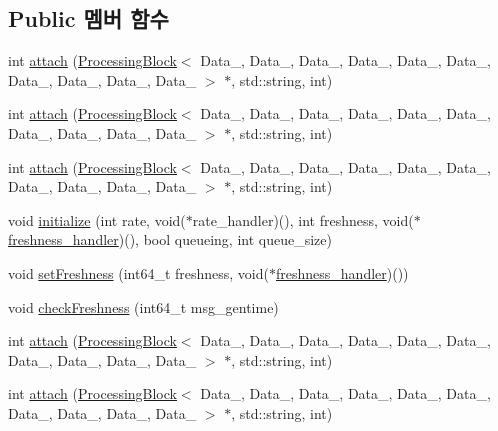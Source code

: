 \subsection*{Public 멤버 함수}
\begin{DoxyCompactItemize}
\item 
int \hyperlink{classInputDataPort__PB_a1e2a0dd2fc47211496927695a511e1a5}{attach} (\hyperlink{classProcessingBlock}{Processing\+Block}$<$ Data\+\_, Data\+\_, Data\+\_, Data\+\_, Data\+\_, Data\+\_, Data\+\_, Data\+\_, Data\+\_, Data\+\_ $>$ $\ast$, std\+::string, int)
\item 
int \hyperlink{classInputDataPort__PB_a1e2a0dd2fc47211496927695a511e1a5}{attach} (\hyperlink{classProcessingBlock}{Processing\+Block}$<$ Data\+\_, Data\+\_, Data\+\_, Data\+\_, Data\+\_, Data\+\_, Data\+\_, Data\+\_, Data\+\_, Data\+\_ $>$ $\ast$, std\+::string, int)
\item 
int \hyperlink{classInputDataPort__PB_a1e2a0dd2fc47211496927695a511e1a5}{attach} (\hyperlink{classProcessingBlock}{Processing\+Block}$<$ Data\+\_, Data\+\_, Data\+\_, Data\+\_, Data\+\_, Data\+\_, Data\+\_, Data\+\_, Data\+\_, Data\+\_ $>$ $\ast$, std\+::string, int)
\item 
void \hyperlink{classInputDataPort__PB_a86f4f5662cd09fab17a1027815a2aaa3}{initialize} (int rate, void($\ast$rate\+\_\+handler)(), int freshness, void($\ast$\hyperlink{sample__main_8cpp_ae2b580f894f38496da91bce6c31e186f}{freshness\+\_\+handler})(), bool queueing, int queue\+\_\+size)
\item 
void \hyperlink{classInputDataPort__PB_afc60b73a230f505302984dd8421db791}{set\+Freshness} (int64\+\_\+t freshness, void($\ast$\hyperlink{sample__main_8cpp_ae2b580f894f38496da91bce6c31e186f}{freshness\+\_\+handler})())
\item 
void \hyperlink{classInputDataPort__PB_a43ed8a54ce27b50a0ac8a33f1f93e938}{check\+Freshness} (int64\+\_\+t msg\+\_\+gentime)
\item 
int \hyperlink{classInputDataPort__PB_a1e2a0dd2fc47211496927695a511e1a5}{attach} (\hyperlink{classProcessingBlock}{Processing\+Block}$<$ Data\+\_, Data\+\_, Data\+\_, Data\+\_, Data\+\_, Data\+\_, Data\+\_, Data\+\_, Data\+\_, Data\+\_ $>$ $\ast$, std\+::string, int)
\item 
int \hyperlink{classInputDataPort__PB_a1e2a0dd2fc47211496927695a511e1a5}{attach} (\hyperlink{classProcessingBlock}{Processing\+Block}$<$ Data\+\_, Data\+\_, Data\+\_, Data\+\_, Data\+\_, Data\+\_, Data\+\_, Data\+\_, Data\+\_, Data\+\_ $>$ $\ast$, std\+::string, int)

\end{DoxyCompactItemize}
